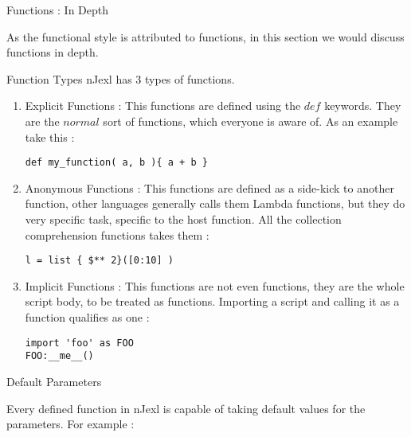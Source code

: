 \begin{section}{Functions : In Depth}

As the functional style is attributed to functions, in this section
we would discuss functions in depth.

\begin{subsection}{Function Types}
nJexl has 3 types of functions.
\begin{enumerate}
\item{Explicit Functions :
This functions are defined using the $def$ keywords.
They are the $normal$ sort of functions, which everyone is aware of.
As an example take this :

\begin{lstlisting}[style=JexlStyle]
def my_function( a, b ){ a + b }
\end{lstlisting}
}

\item{Anonymous Functions :
This functions are defined as a side-kick to another function, 
other languages generally calls them Lambda functions, but they do very specific 
task, specific to the host function. 
All the collection comprehension functions takes them :
\begin{lstlisting}[style=JexlStyle]
l = list { $** 2}([0:10] )
\end{lstlisting}
}

\item{Implicit Functions :
This functions are not even functions, they are the whole script body, 
to be treated as functions. Importing a script and calling it 
as a function qualifies as one : 
\begin{lstlisting}[style=JexlStyle]
import 'foo' as FOO
FOO:__me__()
\end{lstlisting}
}
\end{enumerate}

\end{subsection}

\begin{subsection}{Default Parameters}

Every defined function in nJexl is capable of taking default values
for the parameters. For example :


\end{subsection}
\end{section}

